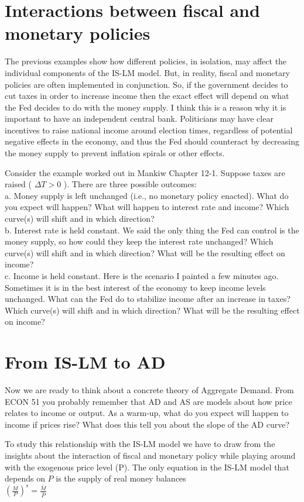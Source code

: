 \documentclass[10pt]{article}
\begin{document}
\section*{Interactions between fiscal and monetary policies}
The previous examples show how different policies, in isolation, may affect the individual components of the IS-LM model. But, in reality, fiscal and monetary policies are often implemented in conjunction. So, if the government decides to cut taxes in order to increase income then the exact effect will depend on what the Fed decides to do with the money supply. I think this is a reason why it is important to have an independent central bank. Politicians may have clear incentives to raise national income around election times, regardless of potential negative effects in the economy, and thus the Fed should counteract by decreasing the money supply to prevent inflation spirals or other effects.

Consider the example worked out in Mankiw Chapter 12-1. Suppose taxes are raised ( $\Delta T>0$ ). There are three possible outcomes:\\
a. Money supply is left unchanged (i.e., no monetary policy enacted). What do you expect will happen? What will happen to interest rate and income? Which curve(s) will shift and in which direction?\\
b. Interest rate is held constant. We said the only thing the Fed can control is the money supply, so how could they keep the interest rate unchanged? Which curve(s) will shift and in which direction? What will be the resulting effect on income?\\
c. Income is held constant. Here is the scenario I painted a few minutes ago. Sometimes it is in the best interest of the economy to keep income levels unchanged. What can the Fed do to stabilize income after an increase in taxes? Which curve(s) will shift and in which direction? What will be the resulting effect on income?

\section*{From IS-LM to AD}
Now we are ready to think about a concrete theory of Aggregate Demand. From ECON 51 you probably remember that AD and AS are models about how price relates to income or output. As a warm-up, what do you expect will happen to income if prices rise? What does this tell you about the slope of the AD curve?

To study this relationship with the IS-LM model we have to draw from the insights about the interaction of fiscal and monetary policy while playing around with the exogenous price level (P). The only equation in the IS-LM model that depends on $P$ is the supply of real money balances\\
$\left(\frac{M}{P}\right)^{s}=\frac{\bar{M}}{\bar{P}}$
\end{document}
